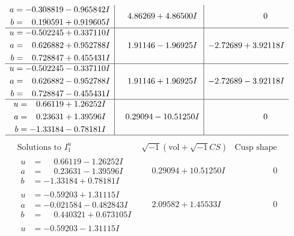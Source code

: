 \documentclass[1p]{elsarticle_modified}
\theoremstyle{definition}
\newcommand{\I}{\sqrt{-1}}
\begin{document}
$$\begin{array}{c|c|c}
\begin{aligned}
a &= -0.308819 - 0.965842 I \\
b &= \phantom{-}0.190591 + 0.919605 I\end{aligned}
 & \phantom{-}4.86269 + 4.86500 I & \phantom{-0.000000 } 0 \\ \hline\begin{aligned}
u &= -0.502245 + 0.337110 I \\
a &= \phantom{-}0.626882 + 0.952788 I \\
b &= \phantom{-}0.728847 + 0.455431 I\end{aligned}
 & \phantom{-}1.91146 - 1.96925 I & -2.72689 + 3.92118 I \\ \hline\begin{aligned}
u &= -0.502245 - 0.337110 I \\
a &= \phantom{-}0.626882 - 0.952788 I \\
b &= \phantom{-}0.728847 - 0.455431 I\end{aligned}
 & \phantom{-}1.91146 + 1.96925 I & -2.72689 - 3.92118 I \\ \hline\begin{aligned}
u &= \phantom{-}0.66119 + 1.26252 I \\
a &= \phantom{-}0.23631 + 1.39596 I \\
b &= -1.33184 - 0.78181 I\end{aligned}
 & \phantom{-}0.29094 - 10.51250 I & \phantom{-0.000000 } 0\\
 \hline 
 \end{array}$$\newpage$$\begin{array}{c|c|c}  
\text{Solutions to }I^u_{1}& \I (\text{vol} + \sqrt{-1}CS) & \text{Cusp shape}\\
 \hline 
\begin{aligned}
u &= \phantom{-}0.66119 - 1.26252 I \\
a &= \phantom{-}0.23631 - 1.39596 I \\
b &= -1.33184 + 0.78181 I\end{aligned}
 & \phantom{-}0.29094 + 10.51250 I & \phantom{-0.000000 } 0 \\ \hline\begin{aligned}
u &= -0.59203 + 1.31115 I \\
a &= -0.021584 - 0.482843 I \\
b &= \phantom{-}0.440321 + 0.673105 I\end{aligned}
 & \phantom{-}2.09582 + 1.45533 I & \phantom{-0.000000 } 0 \\ \hline\begin{aligned}
u &= -0.59203 - 1.31115 I \\

\end{aligned}
\end{array}$$
\end{document}
